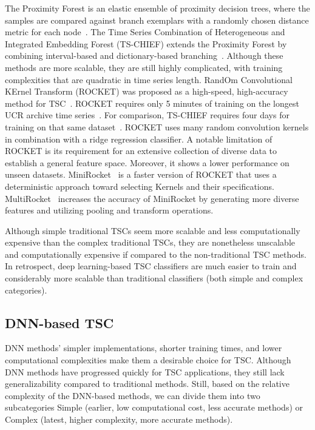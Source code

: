 \documentclass[journal]{IEEEtran}
\begin{document}
The Proximity Forest is an elastic ensemble of proximity decision trees, where the samples are compared against branch exemplars with a randomly chosen distance metric for each node~\cite{lucas2019proximity}. The Time Series Combination of Heterogeneous and Integrated Embedding Forest (TS-CHIEF) extends the Proximity Forest by combining interval-based and dictionary-based branching~\cite{shifaz2019ts}. Although these methods are more scalable, they are still highly complicated, with training complexities that are quadratic in time series length. RandOm Convolutional KErnel Transform (ROCKET) was proposed as a high-speed, high-accuracy method for TSC~\cite{dempster2020rocket}. ROCKET requires only 5 minutes of training on the longest UCR archive time series~\cite{dempster2020rocket}. For comparison, TS-CHIEF requires four days for training on that same dataset~\cite{dempster2020rocket}. ROCKET uses many random convolution kernels in combination with a ridge regression classifier. A notable limitation of ROCKET is its requirement for an extensive collection of diverse data to establish a general feature space. Moreover, it shows a lower performance on unseen datasets. MiniRocket~\cite{dempster_minirocket_2021} is a faster version of ROCKET that uses a deterministic approach toward selecting Kernels and their specifications. MultiRocket~\cite{tan_multirocket_2022} increases the accuracy of MiniRocket by generating more diverse features and utilizing pooling and transform operations.

Although simple traditional TSCs seem more scalable and less computationally expensive than the complex traditional TSCs, they are nonetheless unscalable and computationally expensive if compared to the non-traditional TSC methods. In retrospect, deep learning-based TSC classifiers are much easier to train and considerably more scalable than traditional classifiers (both simple and complex categories).
\subsection{DNN-based TSC}
DNN methods’ simpler implementations, shorter training times, and lower computational complexities make them a desirable choice for TSC. Although DNN methods have progressed quickly for TSC applications, they still lack generalizability compared to traditional methods. Still, based on the relative complexity of the DNN-based methods, we can divide them into two subcategories Simple (earlier, low computational cost, less accurate methods) or Complex (latest, higher complexity, more accurate methods).
\end{document}
